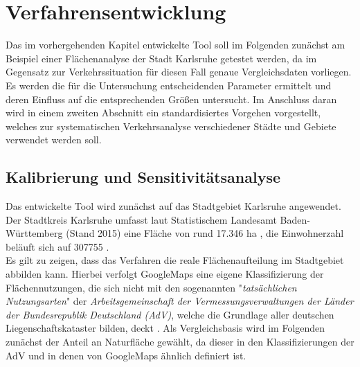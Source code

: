 \section{Verfahrensentwicklung}
\label{sec:verfahrensentwicklung}

Das im vorhergehenden Kapitel entwickelte Tool soll im Folgenden zunächst am Beispiel einer Flächenanalyse der Stadt Karlsruhe getestet werden, da im Gegensatz zur Verkehrssituation für diesen Fall genaue Vergleichsdaten vorliegen. Es werden die für die Untersuchung entscheidenden Parameter ermittelt und deren Einfluss auf die entsprechenden Größen untersucht. Im Anschluss daran wird in einem zweiten Abschnitt ein standardisiertes Vorgehen vorgestellt, welches zur systematischen Verkehrsanalyse verschiedener Städte und Gebiete verwendet werden soll.

\subsection{Kalibrierung und Sensitivitätsanalyse}

Das entwickelte Tool wird zunächst auf das Stadtgebiet Karlsruhe angewendet. Der Stadtkreis Karlsruhe umfasst laut Statistischem Landesamt Baden-Württemberg (Stand 2015) eine Fläche von rund \num{17.346} \si{\hectare} \cite{StatBaWu_Flaeche}, die Einwohnerzahl beläuft sich auf \num{307755} \cite{StatBaWu_Einw}.\\
Es gilt zu zeigen, dass das Verfahren die reale Flächenaufteilung im Stadtgebiet abbilden kann. Hierbei verfolgt GoogleMaps eine eigene Klassifizierung der Flächennutzungen, die sich nicht mit den sogenannten "\textit{tatsächlichen Nutzungsarten}" der  \textit{Arbeitsgemeinschaft der Vermessungsverwaltungen der Länder der Bundesrepublik Deutschland (AdV)}, welche die Grundlage aller deutschen Liegenschaftskataster bilden, deckt \cite{advnutz}. Als Vergleichsbasis wird im Folgenden zunächst der Anteil an Naturfläche gewählt, da dieser in den Klassifizierungen der AdV und in denen von GoogleMaps ähnlich definiert ist.\\ 


